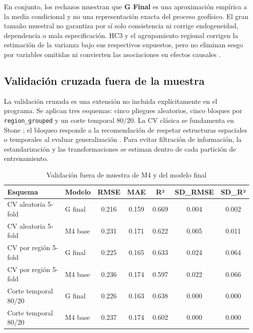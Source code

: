 \documentclass{style}
\newcommand{\var}[1]{\texttt{#1}}
\begin{document}
En conjunto, los rechazos muestran que \textbf{G Final} es una aproximación empírica a la media condicional y no una representación exacta del proceso geofísico. El gran tamaño muestral no garantiza por sí solo consistencia ni corrige endogeneidad, dependencia o mala especificación. HC3 y el agrupamiento regional corrigen la estimación de la varianza bajo sus respectivos supuestos, pero no eliminan sesgo por variables omitidas ni convierten las asociaciones en efectos causales \cite{mackinnonwhite1985,cameronmiller2015}.



\subsection{Validación cruzada fuera de la muestra}


La validación cruzada es una extensión no incluida explícitamente en el programa. Se aplican tres esquemas: cinco pliegues aleatorios, cinco bloques por \var{region\_grouped} y un corte temporal $80/20$. La CV clásica se fundamenta en Stone \cite{stone1974}; el bloqueo responde a la recomendación de respetar estructuras espaciales o temporales al evaluar generalización \cite{roberts2017}. Para evitar filtración de información, la estandarización y las transformaciones se estiman dentro de cada partición de entrenamiento.

\begin{table}[H]
    \centering
    \caption{Validación fuera de muestra de M4 y del modelo final}
    \scriptsize
    \setlength{\tabcolsep}{8pt} 
    \begin{tabular}{llccccc}
    \toprule
    \textbf{Esquema} & \textbf{Modelo} & \textbf{RMSE} & \textbf{MAE} & \textbf{R²} & \textbf{SD\_RMSE} & \textbf{SD\_R²} \\
    \midrule
    CV aleatoria 5-fold & G final & 0.216 & 0.159 & 0.669 & 0.004 & 0.002 \\
    CV aleatoria 5-fold & M4 base & 0.231 & 0.171 & 0.622 & 0.005 & 0.011 \\
    CV por región 5-fold & G final & 0.225 & 0.165 & 0.633 & 0.024 & 0.064 \\
    CV por región 5-fold & M4 base & 0.236 & 0.174 & 0.597 & 0.022 & 0.066 \\
    Corte temporal 80/20 & G final & 0.226 & 0.163 & 0.638 & 0.000 & 0.000 \\
    Corte temporal 80/20 & M4 base & 0.237 & 0.174 & 0.602 & 0.000 & 0.000 \\
    \bottomrule
    \end{tabular}
\end{table}
\end{document}
